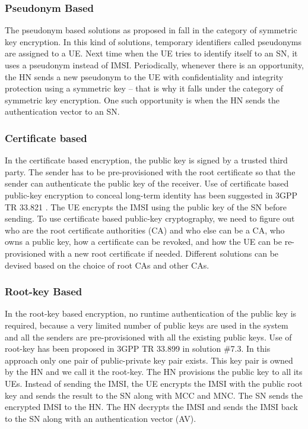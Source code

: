 \documentclass[conference]{IEEEtran}
\begin{document}

\subsubsection{Pseudonym Based}
The pseudonym based solutions as proposed in \cite{pseudonym_ericsson,pseudonym_valtteri_philip,CCS15,SSR15,pseudonym_mohsin} fall in the category of symmetric key encryption.  In this kind of solutions, temporary identifiers called pseudonyms are assigned to a UE. Next time when the UE tries to identify itself to an SN, it uses a pseudonym instead of IMSI. Periodically, whenever there is an opportunity, the HN sends a new pseudonym to the UE with confidentiality and integrity protection using a symmetric key -- that is why it falls under the category of symmetric key encryption. One such opportunity is when the HN sends the authentication vector to an SN.

\subsubsection{Certificate based} In the certificate based encryption, the public key is signed by a trusted third party. The sender has to be pre-provisioned with the root certificate so that the sender can authenticate the public key of the receiver. Use of certificate based public-key encryption to conceal long-term identity has been suggested in 3GPP TR 33.821 \cite{TR33821}. The UE encrypts the IMSI using the public key of the SN before sending. To use certificate based public-key cryptography, we need to figure out who are the root certificate authorities (CA) and who else can be a CA, who owns a public key, how a certificate can be revoked, and how the UE can be re-provisioned with a new root certificate if needed. Different solutions can be devised based on the choice of root CAs and other CAs.


\subsubsection{Root-key Based} In the root-key based encryption, no runtime authentication of the public key is required, because a very limited number of public keys are used in the system and all the senders are pre-provisioned with all the existing public keys. Use of root-key has been proposed in 3GPP TR 33.899 in solution \#7.3. In this approach only one pair of public-private key pair exists. This key pair is owned by the HN and we call it the root-key. The HN provisions the public key to all its UEs.  Instead of sending the IMSI, the UE encrypts the IMSI with the public root key and sends the result to the SN along with MCC and MNC. The SN sends the encrypted IMSI to the HN. The HN decrypts the IMSI and sends the IMSI back to the SN along with an authentication vector (AV).
\end{document}
